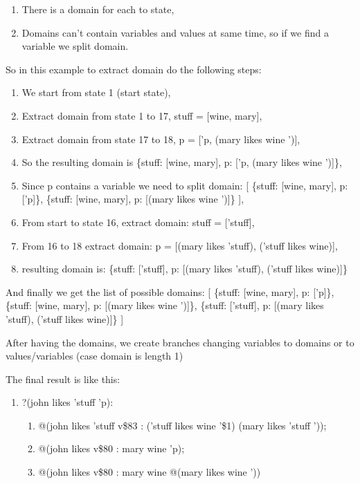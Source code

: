 \documentclass{article}
\begin{document}
\begin{enumerate}
\item There is a domain for each to state,
\item Domains can't contain variables and values at same time, so if we find a variable we split domain.
\end{enumerate}

So in this example to extract domain do the following steps:

\begin{enumerate}
\item We start from state 1 (start state),
\item Extract domain from state 1 to 17, stuff = [wine, mary],
\item Extract domain from state 17 to 18, p = ['p, (mary likes wine ')],
\item So the resulting domain is \{stuff: [wine, mary], p: ['p, (mary likes wine ')]\},
\item Since p contains a variable we need to split domain: [
      \{stuff: [wine, mary], p: ['p]\},
      \{stuff: [wine, mary], p: [(mary likes wine ')]\}
],
\item From start to state 16, extract domain: stuff = ['stuff],
\item From 16 to 18 extract domain: p = [(mary likes 'stuff), ('stuff likes wine)],
\item resulting domain is: \{stuff: ['stuff], p: [(mary likes 'stuff), ('stuff likes wine)]\}
\end{enumerate}

And finally we get the list of possible domains:
[
      \{stuff: [wine, mary], p: ['p]\},
      \{stuff: [wine, mary], p: [(mary likes wine ')]\},
      \{stuff: ['stuff], p: [(mary likes 'stuff), ('stuff likes wine)]\}
]

After having the domains, we create branches changing variables to domains or 
to values/variables (case domain is length 1)

The final result is like this: 

\begin{enumerate}
\item ?(john likes 'stuff 'p): 
      \begin{enumerate}
      \item @(john likes 'stuff {{v\$83 : ('stuff likes wine '\$1) (mary likes 'stuff ')}});
      \item @(john likes {{v\$80 : mary wine}} 'p);
      \item @(john likes {{v\$80 : mary wine}} @(mary likes wine '))
      \end{enumerate}
\end{enumerate}
\end{document}
